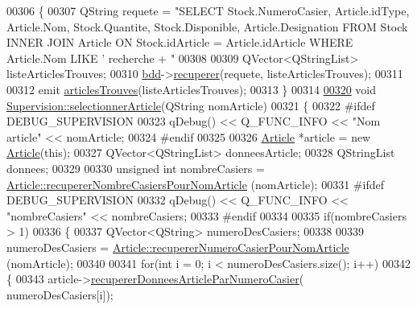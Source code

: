 \begin{DoxyCode}
{00306 \{
00307     QString requete = \textcolor{stringliteral}{"SELECT Stock.NumeroCasier, Article.idType, Article.Nom, Stock.Quantite,
       Stock.Disponible, Article.Designation FROM Stock INNER JOIN Article ON Stock.idArticle = Article.idArticle WHERE
       Article.Nom LIKE '%
       recherche + \textcolor{stringliteral}{"%
00308 
00309     QVector<QStringList> listeArticlesTrouves;
00310     \hyperlink{class_supervision_ac9a970d4f511f2eed5da4aed037533ab}{bdd}->\hyperlink{class_bdd_a8f25d29d309041bbf875700db0efd97b}{recuperer}(requete, listeArticlesTrouves);
00311 
00312     emit \hyperlink{class_supervision_a3023468d106abfe7dc697e61a63778ed}{articlesTrouves}(listeArticlesTrouves);
00313 \}
00314 
\hyperlink{class_supervision_a2efb7e4dabe2664c9cfd41d703b6250c}{00320} \textcolor{keywordtype}{void} \hyperlink{class_supervision_a2efb7e4dabe2664c9cfd41d703b6250c}{Supervision::selectionnerArticle}(QString nomArticle)
00321 \{
00322 \textcolor{preprocessor}{    #ifdef DEBUG\_SUPERVISION}
00323         qDebug() << Q\_FUNC\_INFO << \textcolor{stringliteral}{"Nom article"} << nomArticle;
00324 \textcolor{preprocessor}{    #endif}
00325 
00326     \hyperlink{class_article}{Article} *article = \textcolor{keyword}{new} \hyperlink{class_article}{Article}(\textcolor{keyword}{this});
00327     QVector<QStringList> donneesArticle;
00328     QStringList donnees;
00329 
00330     \textcolor{keywordtype}{unsigned} \textcolor{keywordtype}{int} nombreCasiers = \hyperlink{class_article_acdd796ad55a7fde0c229c8c2df7050cc}{Article::recupererNombreCasiersPourNomArticle}
      (nomArticle);    
00331 \textcolor{preprocessor}{    #ifdef DEBUG\_SUPERVISION}
00332         qDebug() << Q\_FUNC\_INFO << \textcolor{stringliteral}{"nombreCasiers"} << nombreCasiers;
00333 \textcolor{preprocessor}{    #endif}
00334 
00335     \textcolor{keywordflow}{if}(nombreCasiers > 1)
00336     \{
00337         QVector<QString> numeroDesCasiers;
00338 
00339         numeroDesCasiers = \hyperlink{class_article_aa311f3d149340622383c418444aa65a4}{Article::recupererNumeroCasierPourNomArticle}
      (nomArticle);
00340 
00341         \textcolor{keywordflow}{for}(\textcolor{keywordtype}{int} i = 0; i < numeroDesCasiers.size(); i++)
00342         \{
00343             article->\hyperlink{class_article_a5d8241c703f142bbc8b011f867fd953f}{recupererDonneesArticleParNumeroCasier}(
      numeroDesCasiers[i]);
}}}
\end{DoxyCode}
